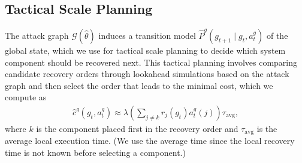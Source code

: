 \documentclass[sigconf]{acmart}
\begin{document}
%
%
%

\subsection{Tactical Scale Planning}
The attack graph $\mathcal{G}(\hat{\theta})$ induces a transition model $\hat{P}^g(g_{t+1} \mid g_t, a^g_t)$ of the global state, which we use for tactical scale planning to decide which system component should be recovered next. This tactical planning involves comparing candidate recovery orders through lookahead simulations based on the attack graph and then select the order that leads to the minimal cost, which we compute as 
\begin{align*}
\hat{c}^g(g_t, a^g_t) \approx \lambda \left(\sum_{j\neq k}r_j(g_t)a^g_t(j)\right)\tau_{\text{avg}},
\end{align*}
where $k$ is the component placed first in the recovery order and $\tau_\text{avg}$ is the average local execution time. (We use the average time since the local recovery time is not known before selecting a component.)
\end{document}
